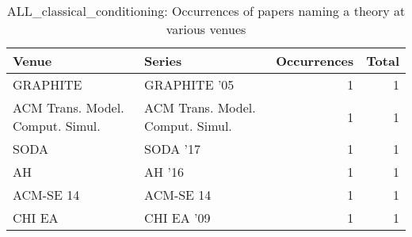 \begin{table*}[t]
\begin{tabular}{llrr}
Venue & Series & Occurrences & Total\\\hline
\multirow{1}{*}{GRAPHITE } & GRAPHITE '05 & 1 & \multirow{1}{*}{1}\\
\multirow{1}{*}{ACM Trans. Model. Comput. Simul.} & ACM Trans. Model. Comput. Simul. & 1 & \multirow{1}{*}{1}\\
\multirow{1}{*}{SODA } & SODA '17 & 1 & \multirow{1}{*}{1}\\
\multirow{1}{*}{AH } & AH '16 & 1 & \multirow{1}{*}{1}\\
\multirow{1}{*}{ACM-SE 14} & ACM-SE 14 & 1 & \multirow{1}{*}{1}\\
\multirow{1}{*}{CHI EA } & CHI EA '09 & 1 & \multirow{1}{*}{1}\\
\end{tabular}
\caption{ALL\_classical\_conditioning: Occurrences of papers naming a theory at various venues}
\end{table*}